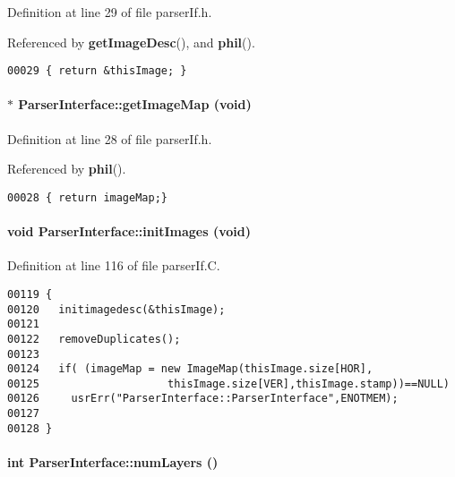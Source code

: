 Definition at line 29 of file parser\-If.h.

Referenced by {\bf get\-Image\-Desc}(), and {\bf phil}().\small\begin{verbatim}00029 { return &thisImage; }
\end{verbatim}\normalsize 
\label{ParserInterface_a3}
\paragraph{ $\ast$ Parser\-Interface::get\-Image\-Map (void)\hspace{0.3cm}{\tt  [inline]}}\hfill



Definition at line 28 of file parser\-If.h.

Referenced by {\bf phil}().\small\begin{verbatim}00028 { return imageMap;}
\end{verbatim}\normalsize 
\label{ParserInterface_a6}
\paragraph{\setlength{\rightskip}{0pt plus 5cm}void Parser\-Interface::init\-Images (void)}\hfill



Definition at line 116 of file parser\-If.C.\small\begin{verbatim}00119 {
00120   initimagedesc(&thisImage);
00121   
00122   removeDuplicates();
00123 
00124   if( (imageMap = new ImageMap(thisImage.size[HOR],
00125                    thisImage.size[VER],thisImage.stamp))==NULL)
00126     usrErr("ParserInterface::ParserInterface",ENOTMEM);
00127 
00128 }
\end{verbatim}\normalsize 
\label{ParserInterface_a11}
\paragraph{\setlength{\rightskip}{0pt plus 5cm}int Parser\-Interface::num\-Layers ()\hspace{0.3cm}{\tt  [inline]}}\hfill



